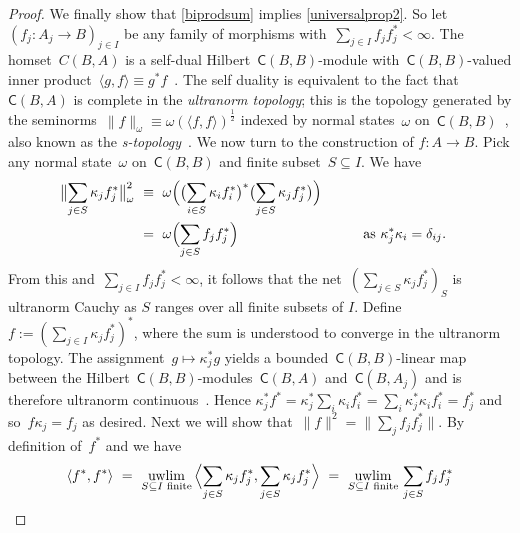 \documentclass[reqno,T1,11pt]{amsproc}
\newcommand{\uwlim}{\qopname\relax m{uwlim}}
\newcommand{\cat}[1]{\mathsf{#1}}		%
\theoremstyle{plain}
\theoremstyle{remark}
\numberwithin{equation}{section}
\begin{document}
\begin{proof}
We finally show that \ref{biprodsum} implies \ref{universalprop2}. So let~$\left(f_j: A_j \to B\right)_{j\in I}$ be any family of morphisms
        with~$\sum_{j \in I}f_jf_j^* < \infty$.
The homset~$C(B,A)$
    is a self-dual Hilbert~$\cat{C}(B,B)$-module
    with~$\cat{C}(B,B)$-valued inner
    product~$\langle g, f\rangle \equiv g^*f$~\cite[Proposition~2.15]{wstarcat}.
The self duality is equivalent to the fact
    that~$\cat{C}(B,A)$ is complete in the \emph{ultranorm topology};
    this is the topology
    generated by the seminorms~$\| f \|_\omega \equiv \omega(\langle f,f\rangle)^\frac{1}{2}$
    indexed by normal states~$\omega$ on~$\cat{C}(B,B)$~\cite[\S149\textsubscript{V}]{bas}, also known as the \emph{s-topology}~\cite[p.~88]{wstarcat}. We now turn to the construction of $f : A \to B$.
    Pick any normal state~$\omega$ on~$\cat{C}(B,B)$
        and finite subset~$S \subseteq I$.  We have
\begin{alignat*}{2}
    \bigl\| \sum_{j \in S} \kappa_j f_j^* \bigr\|^2_\omega
    &\ \equiv \ 
    \omega\Bigl(\bigl(\sum_{i \in S} \kappa_i f_i^*\bigr)^*
            \bigl(\sum_{j \in S} \kappa_j f_j^*\bigr)\Bigr) \\
    &\ =\ 
    \omega\Bigl( \sum_{j \in S} f_j f_j^*
    \Bigr) &\qquad&\text{as~$\kappa_j^*\kappa_i = \delta_{ij}$}.
\end{alignat*}
From this and~$\sum_{j \in I} f_jf_j^* < \infty$,
    it follows that the net~$(\sum_{j \in S} \kappa_j f_j^*)_S$
    is ultranorm Cauchy as $S$ ranges over all finite subsets of $I$.
    Define~$f := ( \sum_{j \in I} \kappa_jf_j^* )^*$,
        where the sum is understood to converge in the ultranorm topology.
The assignment~$g \mapsto \kappa_j^*g$
    yields a bounded~$\cat{C}(B,B)$-linear map between
    the Hilbert~$\cat{C}(B,B)$-modules~$\cat{C}(B,A)$ and~$\cat{C}(B,A_j)$
    and is therefore ultranorm continuous~\cite[\S148]{bas}.
    Hence
        $\kappa_j^* f^*
             =  \kappa_j^* \sum_{i} \kappa_i f_i^*
             =  \sum_i \kappa_{j }^*\kappa_i f_i^*
            =  f_j^*$
            and so~$f \kappa_j = f_j$ as desired.
Next we will show that~$\|f \|^2 = \|\sum_j f_j f_j^*\|$.
    By definition of~$f^*$ and \cite[\S148\textsubscript{V}]{bas}
         we have~
 \begin{equation*}
         \langle f^*, f^*\rangle
         \ =\  \uwlim_{S\subseteq I\text{ finite}} \, \Bigl\langle \sum_{j \in S} \kappa_j f^*_j,
                        \sum_{j \in S}\kappa_j f^*_j \Bigr\rangle
         \ =\  \uwlim_{S\subseteq I\text{ finite}} \, \sum_{j \in S} f_j f_j^*

\end{equation*}
\end{proof}
\end{document}
